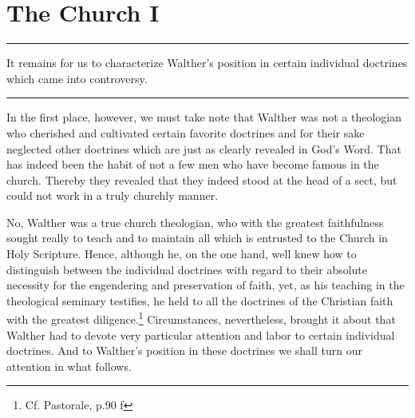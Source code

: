 \chapter{The Church I}

\hrule
\vspace{.30cm}

It remains for us to characterize Walther’s position in certain individual doctrines which came into controversy.

\vspace{.30cm}
\hrule
\vspace{1.25cm}

                In the first place, however, we must take note that Walther was not a theologian who cherished and cultivated certain favorite doctrines and for their sake neglected other doctrines which are just as clearly revealed in God’s Word.  That has indeed been the habit of not a few men who have become famous in the church.  Thereby they revealed that they indeed stood at the head of a sect, but could not work in a truly churchly manner. \par No, Walther was a true church theologian, who with the greatest faithfulness sought really to teach and to maintain all which is entrusted to the Church in Holy Scripture.  Hence, although he, on the one hand, well knew how to distinguish between the individual doctrines with regard to their absolute necessity for the engendering and preservation of faith, yet, as his teaching in the theological seminary testifies, he held to all the doctrines of the Christian faith with the greatest diligence.\footnote{Cf. Pastorale, p.90 f}  Circumstances, nevertheless, brought it about that Walther had to devote very particular attention and labor to certain individual doctrines.  And to Walther’s position in these doctrines we shall turn our attention in what follows.

